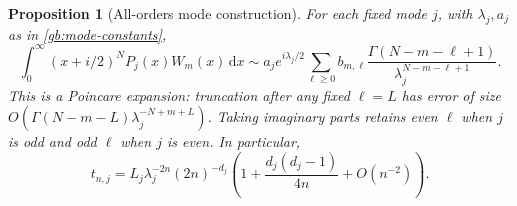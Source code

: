 \documentclass[11pt,a4paper]{article}
\numberwithin{equation}{section}
\newtheorem{proposition}[theorem]{Proposition}
\theoremstyle{definition}
\theoremstyle{remark}
\newcommand{\dd}{\,\mathrm d}
\begin{document}
\begin{proposition}[All-orders mode construction]\label{gb:all-orders}
For each fixed mode $j$, with $\lambda_j,a_j$ as in
\eqref{gb:mode-constants},
\begin{equation}\label{gb:all-orders-moments}
 \int_0^\infty(x+i/2)^NP_j(x)W_m(x)\dd x
 \sim a_je^{i\lambda_j/2}
       \sum_{\ell\ge0}b_{m,\ell}
       \frac{\Gamma(N-m-\ell+1)}{
                            \lambda_j^{N-m-\ell+1}}.
\end{equation}
This is a Poincare expansion: truncation after any fixed $\ell=L$
has error of size
$O(\Gamma(N-m-L)\lambda_j^{-N+m+L})$.
Taking imaginary parts retains even $\ell$ when $j$ is odd and
odd $\ell$ when $j$ is even.  In particular,
\begin{equation}\label{gb:t-first-correction}
 t_{n,j}=L_j\lambda_j^{-2n}(2n)^{-d_j}
       \left(1+\frac{d_j(d_j-1)}{4n}+O(n^{-2})\right).
\end{equation}
\end{proposition}
\end{document}
